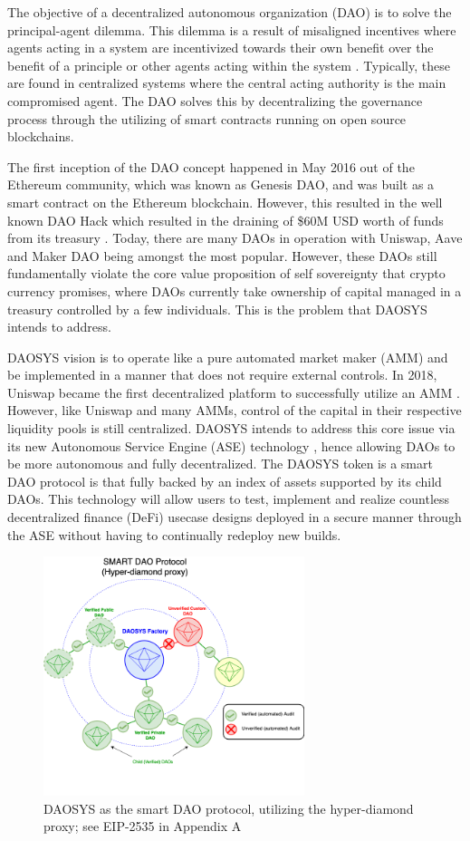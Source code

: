 \documentclass[journal,twocolumn,12pt]{ieeesyscoin}
\begin{document}
The objective of a decentralized autonomous organization (DAO) is to solve the principal-agent dilemma. This dilemma is a result of misaligned incentives where agents acting in a system are incentivized towards their own benefit over the benefit of a principle or other agents acting within the system \cite{San83}. Typically, these are found in centralized systems where the central acting authority is the main compromised agent. The DAO solves this by decentralizing the governance process through the utilizing of smart contracts running on open source blockchains.

The first inception of the DAO concept happened in May 2016 out of the Ethereum community, which was known as Genesis DAO, and was built as a smart contract on the Ethereum blockchain. However, this resulted in the well known DAO Hack which resulted in the draining of \$60M USD worth of funds from its treasury \cite{Sie22}. Today, there are many DAOs in operation with Uniswap, Aave and Maker DAO being amongst the most popular. However, these DAOs still fundamentally violate the core value proposition of self sovereignty that crypto currency promises, where DAOs currently take ownership of capital managed in a treasury controlled by a few individuals. This is the problem that DAOSYS intends to address.

DAOSYS vision is to operate like a pure automated market maker (AMM) and be implemented in a manner that does not require external controls. In 2018, Uniswap became the first decentralized platform to successfully utilize an AMM \cite{Uni19}. However, like Uniswap and many AMMs, control of the capital in their respective liquidity pools is still centralized. DAOSYS intends to address this core issue via its new Autonomous Service Engine (ASE) technology \cite{Sys22}, hence allowing DAOs to be more autonomous and fully decentralized. The DAOSYS token is a smart DAO protocol is that fully backed by an index of assets supported by its child DAOs. This technology will allow users to test, implement and realize countless decentralized finance (DeFi) usecase designs deployed in a secure manner through the ASE without having to continually redeploy new builds.

\begin{figure}[h!]
\includegraphics[width=3in]{img/smart_dao.png}
\caption{DAOSYS as the smart DAO protocol, utilizing the hyper-diamond proxy; see EIP-2535 in Appendix A} 
\label{fig:daosys_governance}
\end{figure}
\end{document}
